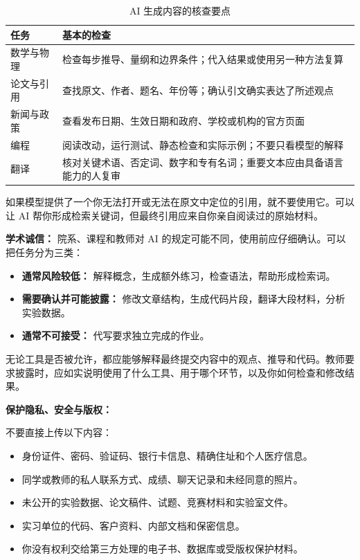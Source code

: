\begin{table}[htbp]
\centering
\begin{tabular}{lp{10cm}}
\hline
任务 & 基本的检查 \\
\hline
数学与物理 & 检查每步推导、量纲和边界条件；代入结果或使用另一种方法复算 \\
论文与引用 & 查找原文、作者、题名、年份等；确认引文确实表达了所述观点 \\
新闻与政策 & 查看发布日期、生效日期和政府、学校或机构的官方页面 \\
编程 & 阅读改动，运行测试、静态检查和实际示例；不要只看模型的解释 \\
翻译 & 核对关键术语、否定词、数字和专有名词；重要文本应由具备语言能力的人复审 \\
\hline
\end{tabular}
\caption{AI 生成内容的核查要点}
\end{table}

如果模型提供了一个你无法打开或无法在原文中定位的引用，就不要使用它。可以让 AI 帮你形成检索关键词，但最终引用应来自你亲自阅读过的原始材料。

\textbf{学术诚信：} 院系、课程和教师对 AI 的规定可能不同，使用前应仔细确认。可以把任务分为三类：

\begin{itemize}
    \item \textbf{通常风险较低：} 解释概念，生成额外练习，检查语法，帮助形成检索词。
    \item \textbf{需要确认并可能披露：} 修改文章结构，生成代码片段，翻译大段材料，分析实验数据。
    \item \textbf{通常不可接受：} 代写要求独立完成的作业。
\end{itemize}

无论工具是否被允许，都应能够解释最终提交内容中的观点、推导和代码。教师要求披露时，应如实说明使用了什么工具、用于哪个环节，以及你如何检查和修改结果。

\textbf{保护隐私、安全与版权：}

不要直接上传以下内容：

\begin{itemize}
    \item 身份证件、密码、验证码、银行卡信息、精确住址和个人医疗信息。
    \item 同学或教师的私人联系方式、成绩、聊天记录和未经同意的照片。
    \item 未公开的实验数据、论文稿件、试题、竞赛材料和实验室文件。
    \item 实习单位的代码、客户资料、内部文档和保密信息。
    \item 你没有权利交给第三方处理的电子书、数据库或受版权保护材料。
\end{itemize}

